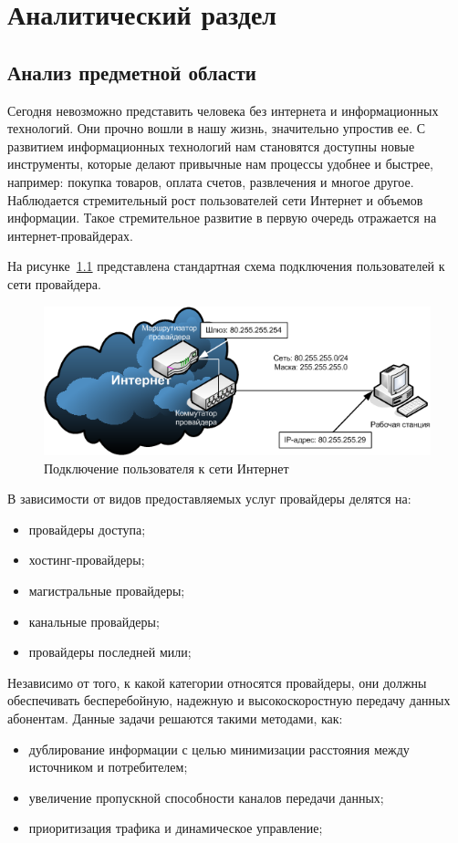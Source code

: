 \chapter{Аналитический раздел}
\label{cha:analysis}
\section{Анализ предметной области}
Сегодня невозможно представить человека без интернета и информационных технологий. Они прочно вошли в нашу жизнь, значительно упростив ее. С развитием информационных технологий нам становятся доступны новые инструменты, которые делают привычные нам процессы удобнее и быстрее, например: покупка товаров, оплата счетов, развлечения и многое другое. Наблюдается стремительный рост пользователей сети Интернет и объемов информации. Такое стремительное развитие в первую очередь отражается на интернет-провайдерах.

На рисунке~\ref{pic:user_connection_schema} представлена стандартная схема подключения пользователей к сети провайдера.
\begin{figure}
\centering
\includegraphics[scale=0.7]{pictures/user_connection_schema}
\caption{Подключение пользователя к сети Интернет}
\label{pic:user_connection_schema}
\end{figure}

В зависимости от видов предоставляемых услуг провайдеры делятся на:
\begin{itemize}
\item провайдеры доступа;
\item хостинг-провайдеры;
\item магистральные провайдеры;
\item канальные провайдеры;
\item провайдеры последней мили;
\end{itemize}

Независимо от того, к какой категории относятся провайдеры, они должны обеспечивать бесперебойную, надежную и высокоскоростную передачу данных абонентам. Данные задачи решаются такими методами, как:
\begin{itemize}
\item дублирование информации с целью минимизации расстояния между источником и потребителем;
\item увеличение пропускной способности каналов передачи данных;
\item приоритизация трафика и динамическое управление;
\end{itemize}

